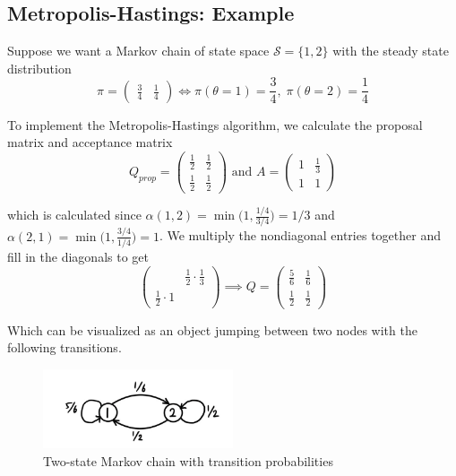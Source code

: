 \documentclass{article}
\begin{document}
\subsection{Metropolis-Hastings: Example}

  Suppose we want a Markov chain of state space $\mathcal{S} = \{1, 2\}$ with the steady state distribution
  \begin{equation}
    \pi = \begin{pmatrix} \frac{3}{4} & \frac{1}{4} \end{pmatrix} \iff \pi(\theta = 1) = \frac{3}{4}, \; \pi(\theta = 2) = \frac{1}{4}
  \end{equation}

  To implement the Metropolis-Hastings algorithm, we calculate the proposal matrix and acceptance matrix
  \begin{equation}
    Q_{prop} = \begin{pmatrix} \frac{1}{2} & \frac{1}{2} \\ \frac{1}{2} & \frac{1}{2} \end{pmatrix} \text{ and } 
    A = \begin{pmatrix} 1 & \frac{1}{3} \\ 1 & 1 \end{pmatrix}
  \end{equation}

  which is calculated since $\alpha(1, 2) = \min\big(1, \frac{1/4}{3/4} \big) = 1/3$ and $\alpha(2, 1) = \min \big(1, \frac{3/4}{1/4} \big) = 1$. We multiply the nondiagonal entries together and fill in the diagonals to get
  \begin{equation}
    \begin{pmatrix} & \frac{1}{2} \cdot \frac{1}{3} \\ \frac{1}{2} \cdot 1 & \end{pmatrix} \implies 
    Q = \begin{pmatrix} \frac{5}{6} & \frac{1}{6} \\ \frac{1}{2} & \frac{1}{2} \end{pmatrix}
  \end{equation}

  Which can be visualized as an object jumping between two nodes with the following transitions.

  \begin{figure}[H]
    \centering
    \includegraphics[width=0.5\textwidth]{img/2_state_chain.jpg}
    \caption{Two-state Markov chain with transition probabilities}
  \end{figure}
\end{document}
